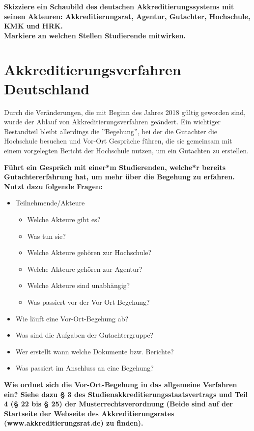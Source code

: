 \documentclass{scrartcl}
\begin{document}
\vspace{1cm}

\textbf{Skizziere ein Schaubild des deutschen Akkreditierungssystems mit seinen Akteuren: Akkreditierungsrat, Agentur, Gutachter, Hochschule, KMK und HRK. \\
Markiere an welchen Stellen Studierende mitwirken.}

\newpage
\section*{Akkreditierungsverfahren Deutschland}
Durch die Veränderungen, die mit Beginn des Jahres 2018 gültig geworden sind, wurde der Ablauf von Akkreditierungsverfahren geändert. Ein wichtiger Bestandteil bleibt allerdings die ''Begehung'', bei der die Gutachter die Hochschule besuchen und Vor-Ort Gespräche führen, die sie gemeinsam mit einem vorgelegten Bericht der Hochschule nutzen, um ein Gutachten zu erstellen.

\vspace{0.5cm}

\textbf{Führt ein Gespräch mit einer*m Studierenden, welche*r bereits Gutachtererfahrung hat, um mehr über die Begehung zu erfahren. Nutzt dazu folgende Fragen: }

\begin{itemize}
\item Teilnehmende/Akteure
	\begin{itemize}
		\item Welche Akteure gibt es?
		\item Was tun sie?
		\item Welche Akteure gehören zur Hochschule?
		\item Welche Akteure gehören zur Agentur?
		\item Welche Akteure sind unabhängig?
		\item Was passiert vor der Vor-Ort Begehung?
	\end{itemize}
\item Wie läuft eine Vor-Ort-Begehung ab?
\item Was sind die Aufgaben der Gutachtergruppe?
\item Wer erstellt wann welche Dokumente bzw. Berichte?
\item Was passiert im Anschluss an eine Begehung?
\end{itemize}

\textbf{Wie ordnet sich die Vor-Ort-Begehung in das allgemeine Verfahren ein? Siehe dazu § 3 des Studienakkreditierungsstaatsvertrags und Teil 4 (§ 22 bis § 25) der Musterrechtsverordnung (Beide sind auf der Startseite der Webseite des Akkreditierungsrates (www.akkreditierungsrat.de) zu finden).}
\end{document}
